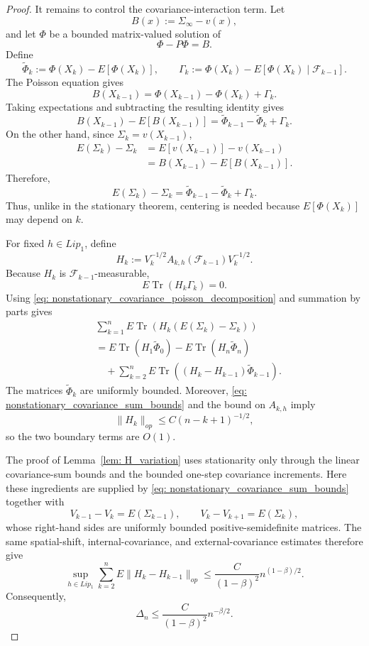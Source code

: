 \documentclass[10pt,a4paper]{article}
\begin{document}
\begin{proof}
It remains to control the covariance-interaction term. Let
\[
B(x):=\Sigma_\infty-v(x),
\]
and let $\Phi$ be a bounded matrix-valued solution of
\[
\Phi-P\Phi=B.
\]
Define
\[
\widetilde\Phi_k
:=
\Phi(X_k)-E[\Phi(X_k)],
\qquad
\Gamma_k
:=
\Phi(X_k)-E[\Phi(X_k)\mid\mathcal F_{k-1}].
\]
The Poisson equation gives
\[
B(X_{k-1})
=
\Phi(X_{k-1})-\Phi(X_k)+\Gamma_k.
\]
Taking expectations and subtracting the resulting identity gives
\[
B(X_{k-1})-E[B(X_{k-1})]
=
\widetilde\Phi_{k-1}
-
\widetilde\Phi_k
+
\Gamma_k.
\]
On the other hand, since $\Sigma_k=v(X_{k-1})$,
\begin{align*}
E(\Sigma_k)-\Sigma_k
&=
E[v(X_{k-1})]-v(X_{k-1})
\\
&=
B(X_{k-1})-E[B(X_{k-1})].
\end{align*}
Therefore,
\begin{equation}
\label{eq: nonstationary_covariance_poisson_decomposition}
E(\Sigma_k)-\Sigma_k
=
\widetilde\Phi_{k-1}
-
\widetilde\Phi_k
+
\Gamma_k.
\end{equation}
Thus, unlike in the stationary theorem, centering is needed because
$E[\Phi(X_k)]$ may depend on $k$.

For fixed $h\in Lip_1$, define
\[
H_k
:=
V_k^{-1/2}
A_{k,h}(\mathcal F_{k-1})
V_k^{-1/2}.
\]
Because $H_k$ is $\mathcal F_{k-1}$-measurable,
\[
E\operatorname{Tr}(H_k\Gamma_k)=0.
\]
Using
\eqref{eq: nonstationary_covariance_poisson_decomposition}
and summation by parts gives
\begin{align*}
&\sum_{k=1}^n
E\operatorname{Tr}
\left(
H_k(E(\Sigma_k)-\Sigma_k)
\right)
\\
&=
E\operatorname{Tr}(H_1\widetilde\Phi_0)
-
E\operatorname{Tr}(H_n\widetilde\Phi_n)
\\
&\quad+
\sum_{k=2}^n
E\operatorname{Tr}
\left(
(H_k-H_{k-1})\widetilde\Phi_{k-1}
\right).
\end{align*}
The matrices $\widetilde\Phi_k$ are uniformly bounded. Moreover,
\eqref{eq: nonstationary_covariance_sum_bounds}
and the bound on $A_{k,h}$ imply
\[
\|H_k\|_{op}
\leq
C(n-k+1)^{-1/2},
\]
so the two boundary terms are $O(1)$.

The proof of Lemma~\ref{lem: H_variation} uses stationarity only
through the linear covariance-sum bounds and the bounded one-step
covariance increments. Here these ingredients are supplied by
\eqref{eq: nonstationary_covariance_sum_bounds} together with
\[
V_{k-1}-V_k=E(\Sigma_{k-1}),
\qquad
V_k-V_{k+1}=E(\Sigma_k),
\]
whose right-hand sides are uniformly bounded positive-semidefinite
matrices. The same spatial-shift, internal-covariance, and
external-covariance estimates therefore give
\[
\sup_{h\in Lip_1}
\sum_{k=2}^n
E\|H_k-H_{k-1}\|_{op}
\leq
\frac{C}{(1-\beta)^2}n^{(1-\beta)/2}.
\]
Consequently,
\[
\Delta_n
\leq
\frac{C}{(1-\beta)^2}n^{-\beta/2}.
\]


\end{proof}
\end{document}
